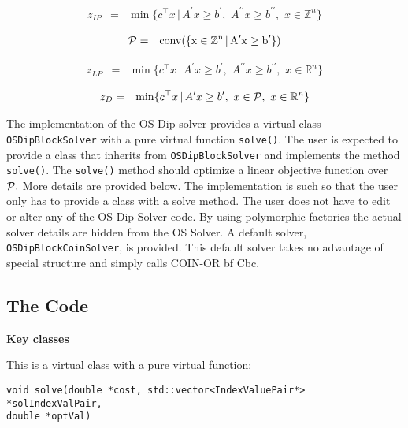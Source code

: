 \documentclass[11pt]{article}
\begin{document}
\begin{eqnarray}
z_{IP} &=&  \min  \{c^{\top} x \, | \, A^{\prime} x \ge b^{\prime},  \,\, 
A^{\prime \prime} x \ge b^{\prime \prime}, \, \, x \in \mathbb{Z}^{n}  \}
\end{eqnarray}

\begin{eqnarray}
{\cal P} &=&  \rm{conv} ( \{ x \in \mathbb{Z}^{n} \, | \, A^{\prime} x \ge
b^{\prime}
\})
\end{eqnarray}


\begin{eqnarray}
z_{LP} &=&  \min  \{c^{\top} x \, | \, A^{\prime} x \ge b^{\prime},  \,\, 
A^{\prime \prime} x \ge b^{\prime \prime}, \, \, x \in \mathbb{R}^{n}  \}
\end{eqnarray}


\begin{eqnarray}
z_{D} &=&  \min  \{c^{\top} x \, | \, A^{\prime} x \ge b^{\prime},  \,\, 
x \in {\cal P}, \, \, x \in \mathbb{R}^{n}  \}
\end{eqnarray}

The implementation of the OS Dip solver provides a virtual class {\tt
OSDipBlockSolver} with a pure virtual function {\tt solve()}.  The user is
expected to provide a class that inherits from {\tt OSDipBlockSolver} and
implements the method {\tt solve()}.  The {\tt solve()} method should optimize a
linear objective function over ${\cal P}.$ More details are provided below. The
implementation is such so that the user only has to provide a class with a solve
method. The user does not have to edit or alter any of the OS Dip Solver code.
By using polymorphic factories the actual solver details are hidden from the OS
Solver.  A default solver, {\tt OSDipBlockCoinSolver}, is provided. This default
solver takes no advantage of special structure and simply calls COIN-OR {bf
Cbc.}

\subsection{The Code}





{\bf Key classes}


\vskip 8pt
  This is a virtual class with a pure virtual
function: 

\begin{verbatim}
void solve(double *cost, std::vector<IndexValuePair*> *solIndexValPair,
double *optVal)
\end{verbatim}
\end{document}

